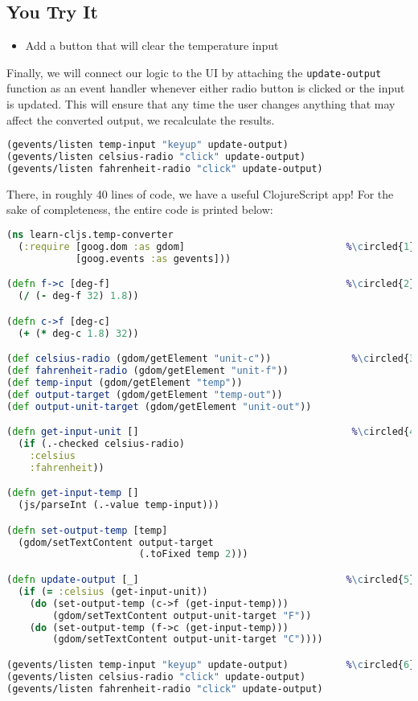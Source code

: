 \documentclass[10pt,twoside,openright]{memoir}
\newcommand*\circled[1]{\tikz[baseline=(char.base)]{
            \node[shape=circle,draw,inner sep=1pt] (char) {#1};}}
\begin{document}
\subsection{You Try It}

\begin{itemize}
\tightlist
\item
  Add a button that will clear the temperature input
\end{itemize}

Finally, we will connect our logic to the UI by attaching the
\texttt{update-output} function as an event handler whenever either
radio button is clicked or the input is updated. This will ensure that
any time the user changes anything that may affect the converted output,
we recalculate the results.

\begin{lstlisting}[language=Clojure]
(gevents/listen temp-input "keyup" update-output)
(gevents/listen celsius-radio "click" update-output)
(gevents/listen fahrenheit-radio "click" update-output)
\end{lstlisting}

There, in roughly 40 lines of code, we have a useful ClojureScript app!
For the sake of completeness, the entire code is printed below:

\begin{lstlisting}[language=Clojure, caption={learn\_cljs/temp\_converter.cljs}]
(ns learn-cljs.temp-converter
  (:require [goog.dom :as gdom]                            %\circled{1}%
            [goog.events :as gevents]))

(defn f->c [deg-f]                                         %\circled{2}%
  (/ (- deg-f 32) 1.8))

(defn c->f [deg-c]
  (+ (* deg-c 1.8) 32))

(def celsius-radio (gdom/getElement "unit-c"))              %\circled{3}%
(def fahrenheit-radio (gdom/getElement "unit-f"))
(def temp-input (gdom/getElement "temp"))
(def output-target (gdom/getElement "temp-out"))
(def output-unit-target (gdom/getElement "unit-out"))

(defn get-input-unit []                                     %\circled{4}%
  (if (.-checked celsius-radio)
    :celsius
    :fahrenheit))

(defn get-input-temp []
  (js/parseInt (.-value temp-input)))

(defn set-output-temp [temp]
  (gdom/setTextContent output-target
                       (.toFixed temp 2)))

(defn update-output [_]                                    %\circled{5}%
  (if (= :celsius (get-input-unit))
    (do (set-output-temp (c->f (get-input-temp)))
        (gdom/setTextContent output-unit-target "F"))
    (do (set-output-temp (f->c (get-input-temp)))
        (gdom/setTextContent output-unit-target "C"))))

(gevents/listen temp-input "keyup" update-output)          %\circled{6}%
(gevents/listen celsius-radio "click" update-output)
(gevents/listen fahrenheit-radio "click" update-output)
\end{lstlisting}
\end{document}
